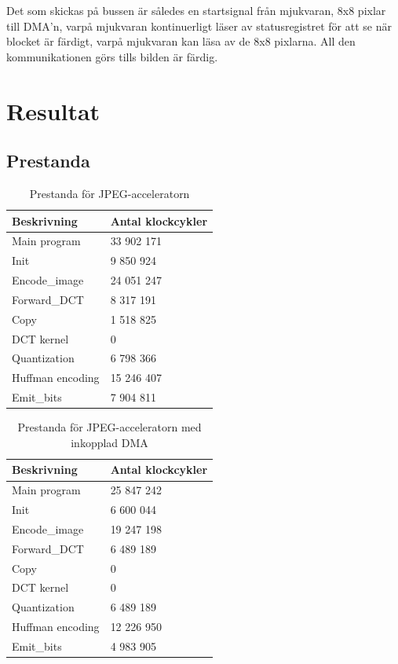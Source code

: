 \documentclass[a4paper]{article}
\begin{document}
Det som skickas på bussen är således en startsignal från mjukvaran, 8x8
pixlar till DMA\rq{}n, varpå mjukvaran kontinuerligt läser av
statusregistret för att se när blocket är färdigt, varpå mjukvaran kan
läsa av de 8x8 pixlarna. All den kommunikationen görs tills bilden är
färdig.

\section{Resultat}

\subsection{Prestanda}

\begin{table}[H]
    \centering
    \begin{tabular}{l l}

        Beskrivning & Antal klockcykler\\
        \hline
        Main program  & 33 902 171 \\
        Init  &  9 850 924 \\
        Encode\_image  & 24 051 247 \\
        Forward\_DCT  & 8 317 191 \\
        Copy  & 1 518 825 \\
        DCT kernel  & 0 \\
        Quantization  & 6 798 366 \\
        Huffman encoding  & 15 246 407 \\
        Emit\_bits  & 7 904 811 \\
    \end{tabular}
    \caption{ Prestanda för JPEG-acceleratorn }
    \label{tab:jpeg_performance_2}
\end{table}
\begin{table}[H]
    \centering
    \begin{tabular}{l l}

        Beskrivning & Antal klockcykler\\
        \hline
        Main program  & 25 847 242 \\
        Init  & 6 600 044 \\
        Encode\_image  & 19 247 198 \\
        Forward\_DCT  & 6 489 189 \\
        Copy  & 0 \\
        DCT kernel  & 0 \\
        Quantization  & 6 489 189 \\
        Huffman encoding  & 12 226 950 \\
        Emit\_bits  & 4 983 905 \\
    \end{tabular}
    \caption{ Prestanda för JPEG-acceleratorn med inkopplad DMA }
    \label{tab:jpeg_performance_3}
\end{table}
\end{document}
